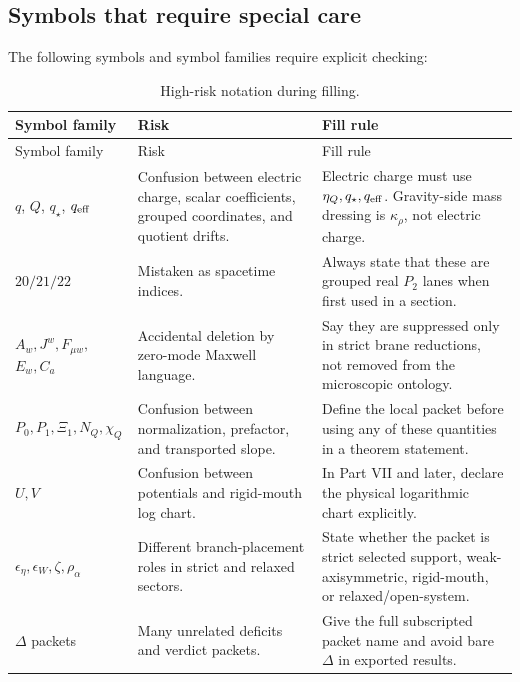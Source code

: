 \subsection{Symbols that require special care}
\label{subsec:symbols-special-care-fill}

The following symbols and symbol families require explicit checking:

\begin{longtable}{@{}L{0.18\textwidth}L{0.35\textwidth}L{0.34\textwidth}@{}}
\caption{High-risk notation during filling.}\label{tab:high-risk-notation-fill}\\
\toprule
Symbol family & Risk & Fill rule \\
\midrule
\endfirsthead
\toprule
Symbol family & Risk & Fill rule \\
\midrule
\endhead
\(q\), \(Q\), \(q_\star\), \(q_{\rm eff}\) & Confusion between electric charge, scalar coefficients, grouped coordinates, and quotient drifts. & Electric charge must use \(\eta_Q,q_\star,q_{\rm eff}\).  Gravity-side mass dressing is \(\kappa_\rho\), not electric charge. \\
\addlinespace
\(20/21/22\) & Mistaken as spacetime indices. & Always state that these are grouped real \(P_2\) lanes when first used in a section. \\
\addlinespace
\(A_w,J^w,F_{\mu w},\)\newline \(E_w,C_a\) & Accidental deletion by zero-mode Maxwell language. & Say they are suppressed only in strict brane reductions, not removed from the microscopic ontology. \\
\addlinespace
\(P_0,P_1,\Xi_1,N_Q,\chi_Q\) & Confusion between normalization, prefactor, and transported slope. & Define the local packet before using any of these quantities in a theorem statement. \\
\addlinespace
\(U,V\) & Confusion between potentials and rigid-mouth log chart. & In Part VII and later, declare the physical logarithmic chart explicitly. \\
\addlinespace
\(\epsilon_\eta,\epsilon_W,\zeta,\rho_\alpha\) & Different branch-placement roles in strict and relaxed sectors. & State whether the packet is strict selected support, weak-axisymmetric, rigid-mouth, or relaxed/open-system. \\
\addlinespace
\(\Delta\) packets & Many unrelated deficits and verdict packets. & Give the full subscripted packet name and avoid bare \(\Delta\) in exported results. \\
\bottomrule
\end{longtable}

